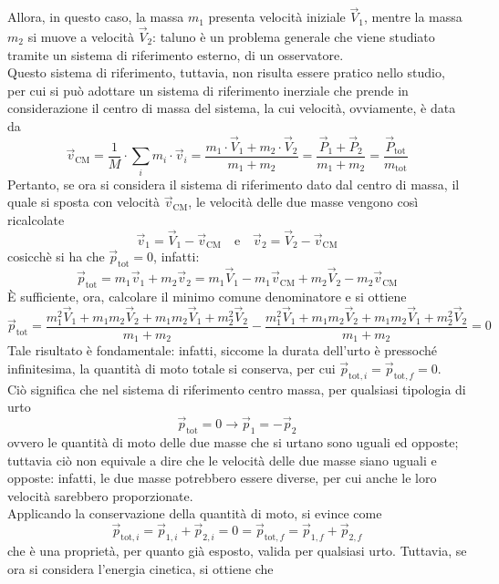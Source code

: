 \documentclass[a4paper]{extarticle}
\begin{document}
\noindent
Allora, in questo caso, la massa $m_1$ presenta velocità iniziale $\vec V_1$, mentre la massa $m_2$ si muove a velocità $\vec V_2$: taluno è un problema generale che viene studiato tramite un sistema di riferimento esterno, di un osservatore.\\
Questo sistema di riferimento, tuttavia, non risulta essere pratico nello studio, per cui si può adottare un sistema di riferimento inerziale che prende in considerazione il centro di massa del sistema, la cui velocità, ovviamente, è data da
\[\vec v_{\text{CM}} = \frac{1}{M} \cdot \sum_i m_i \cdot \vec v_i = \frac{m_1 \cdot \vec V_1 + m_2 \cdot \vec V_2}{m_1+m_2} = \frac{\vec P_1 + \vec P_2}{m_1+m_2}=\frac{\vec P_{\text{tot}}}{m_{\text{tot}}}\]
Pertanto, se ora si considera il sistema di riferimento dato dal centro di massa, il quale si sposta con velocità $\vec v_{\text{CM}}$, le velocità delle due masse vengono così ricalcolate
\[\boxed{\vec v_1 = \vec V_1 - \vec v_{\text{CM}}} \hspace{1em} \text{e} \hspace{1em} \boxed{\vec v_2 = \vec V_2 - \vec v_{\text{CM}}}\]
cosicchè si ha che $\vec p_{\text{tot}}=0$, infatti:
\[\vec p_{\text{tot}}=m_1 \vec v_1 + m_2 \vec v_2 = m_1 \vec V_1 - m_1 \vec v_{\text{CM}} + m_2 \vec V_2 - m_2 \vec v_{\text{CM}}\]
È sufficiente, ora, calcolare il minimo comune denominatore e si ottiene
\[\vec p_{\text{tot}} = \frac{m_1^2 \vec V_1 + m_1m_2 \vec V_2 + m_1m_2 \vec V_1 + m_2^2 \vec V_2}{m_1+m_2} - \frac{m_1^2 \vec V_1 + m_1m_2 \vec V_2 + m_1m_2 \vec V_1 + m_2^2 \vec V_2}{m_1+m_2} = 0\]
Tale risultato è fondamentale: infatti, siccome la durata dell'urto è pressoché infinitesima, la quantità di moto totale si conserva, per cui $\vec p_{\text{tot},i} = \vec p_{\text{tot},f} = 0$.\\
Ciò significa che nel sistema di riferimento centro massa, per qualsiasi tipologia di urto
\[\boxed{\vec p_{\text{tot}} = 0 \longrightarrow \vec p_1 = - \vec p_2}\]
ovvero le quantità di moto delle due masse che si urtano sono uguali ed opposte; tuttavia ciò non equivale a dire che le velocità delle due masse siano uguali e opposte: infatti, le due masse potrebbero essere diverse, per cui anche le loro velocità sarebbero proporzionate.\\
Applicando la conservazione della quantità di moto, si evince come
\[\boxed{\vec p_{\text{tot},i} = \vec p_{1,i} + \vec p_{2,i} = 0 = \vec p_{\text{tot},f} = \vec p_{1,f} + \vec p_{2,f}}\]
che è una proprietà, per quanto già esposto, valida per qualsiasi urto. Tuttavia, se ora si considera l'energia cinetica, si ottiene che
\end{document}
